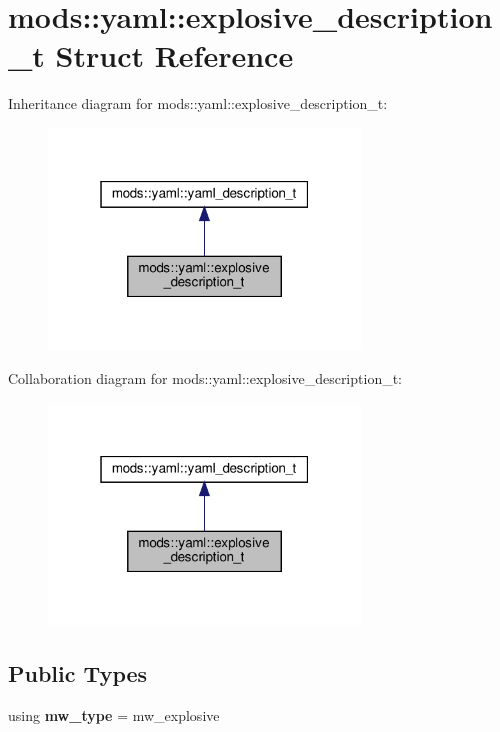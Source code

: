 \hypertarget{structmods_1_1yaml_1_1explosive__description__t}{}\section{mods\+:\+:yaml\+:\+:explosive\+\_\+description\+\_\+t Struct Reference}
\label{structmods_1_1yaml_1_1explosive__description__t}


Inheritance diagram for mods\+:\+:yaml\+:\+:explosive\+\_\+description\+\_\+t\+:
\nopagebreak
\begin{figure}[H]
\begin{center}
\leavevmode
\includegraphics[width=235pt]{structmods_1_1yaml_1_1explosive__description__t__inherit__graph}
\end{center}
\end{figure}


Collaboration diagram for mods\+:\+:yaml\+:\+:explosive\+\_\+description\+\_\+t\+:
\nopagebreak
\begin{figure}[H]
\begin{center}
\leavevmode
\includegraphics[width=235pt]{structmods_1_1yaml_1_1explosive__description__t__coll__graph}
\end{center}
\end{figure}
\subsection*{Public Types}
\begin{DoxyCompactItemize}
\item 
\mbox{\label{structmods_1_1yaml_1_1explosive__description__t_a7d2975489831cb4acfb51f948ccd8c0a}} 
using {\bfseries mw\+\_\+type} = mw\+\_\+explosive
\end{DoxyCompactItemize}

